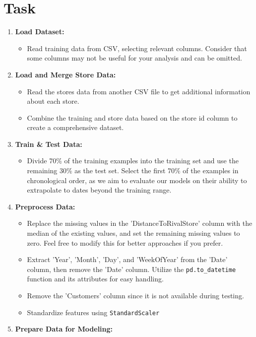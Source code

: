\documentclass{article}
\begin{document}
	\section*{Task}
	\begin{enumerate}
		\item \textbf{Load Dataset:}
		\begin{itemize}
			\item Read training data from CSV, selecting relevant columns. Consider that some columns may not be useful for your analysis and
			can be omitted.
		\end{itemize}
		\item \textbf{Load and Merge Store Data:}
		\begin{itemize}
			\item Read the stores data from another CSV file to get additional information about each store.
			\item Combine the training and store data based on the store id column
			to create a comprehensive dataset.
		\end{itemize}
		\item \textbf{Train \& Test Data:}
		\begin{itemize}
			\item Divide 70\% of the training examples into the training set and use the remaining 30\% as the test set. Select the first 70\% of the examples in chronological order, as we aim to evaluate our models on their ability to extrapolate to dates beyond the training range.
		\end{itemize}
		\item \textbf{Preprocess Data:}
		\begin{itemize}
			\item Replace the missing values in the ’DistanceToRivalStore’ column with the median of the existing values, and set the remaining missing values to zero. Feel free to modify this for better approaches if you prefer.
			\item Extract ’Year’, ’Month’, ’Day’, and ’WeekOfYear’ from the ’Date’ column, then remove the ’Date’ column. Utilize the \texttt{pd.to\_datetime} function and its attributes for easy handling.
			\item Remove the ’Customers’ column since it is not available during testing.
			\item Standardize features using \texttt{StandardScaler}
		\end{itemize}
		\item \textbf{Prepare Data for Modeling:}

\end{enumerate}
\end{document}
